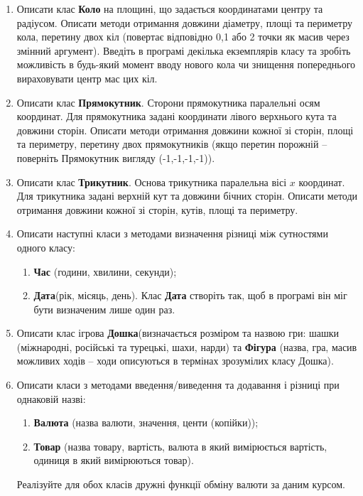 \documentclass[a5paper,titlepage,openany,twoside,
]
{book_unv}%
\makeatletter
\newcommand{\xslalph}[1]{\expandafter\@xslalph\csname c@#1\endcsname}
\newcommand{\@xslalph}[1]{%
    \ifcase#1\or а\or б\or в\or г\or д\or e\or є\or ж\or з\or i%
    \or й\or к\or л\or м\or н\or о\or п\or р\or с\or т%
    \or у\or ф\or х\or ц\or ч\or ш\or ю\or я\or аа\or бб\or вв%
    \else\@ctrerr\fi%
}
\makeatother
\begin{document}
\begin{enumerate}
\begin{enumerate}
\begin{enumerate}
\item
  Описати клас \textbf{Коло} на площині, що задається координатами
  центру та радіусом. Описати методи отримання довжини діаметру, площі
  та периметру кола, перетину двох кіл (повертає відповідно 0,1 або 2
  точки як масив через змінний аргумент). Введіть в програмі декілька
екземплярів класу та зробіть можливість в будь-який момент вводу нового кола
чи знищення попереднього вираховувати центр мас цих кіл.

\item
  Описати клас \textbf{Прямокутник}. Сторони прямокутника паралельні
  осям координат. Для прямокутника задані координати лівого верхнього
  кута та довжини сторін. Описати методи отримання довжини кожної зі
  сторін, площі та периметру, перетину двох прямокутників (якщо перетин
  порожній -- поверніть Прямокутник вигляду (-1,-1,-1,-1)).
\item
  Описати клас \textbf{Трикутник}. Основа трикутника паралельна вісі
  $x$ координат. Для трикутника задані верхній кут та довжини
  бічних сторін. Описати методи отримання довжини кожної зі сторін, кутів,
  площі та периметру.

\item
  Описати наступні класи з методами визначення різниці між сутностями
одного класу:
\begin{enumerate}[label=\xslalph*)]
\item \textbf{Час} (години, хвилини, секунди);
\item \textbf{Дата}(рік, місяць, день).
Клас \textbf{Дата} створіть так, щоб в програмі він міг бути визначеним лише один раз. 
\end{enumerate}

\item
  Описати клас ігрова \textbf{Дошка}(визначається розміром та назвою
  гри: шашки (міжнародні, російські та турецькі, шахи, нарди) та
  \textbf{Фігура} (назва, гра, масив можливих ходів -- ходи описуються в
  термінах зрозумілих класу Дошка).

\item
  Описати класи з методами введення/виведення та  додавання і різниці при 
однаковій назві:
\begin{enumerate}[label=\xslalph*)]
\item \textbf{Валюта} (назва валюти, значення, центи (копійки));
\item \textbf{Товар} (назва товару, вартість, валюта в який вимірюється
вартість, одиниця в який вимірюються товар).
\end{enumerate}
Реалізуйте для обох класів дружні функції обміну валюти за даним курсом.


\end{enumerate}
\end{enumerate}
\end{enumerate}
\end{document}
